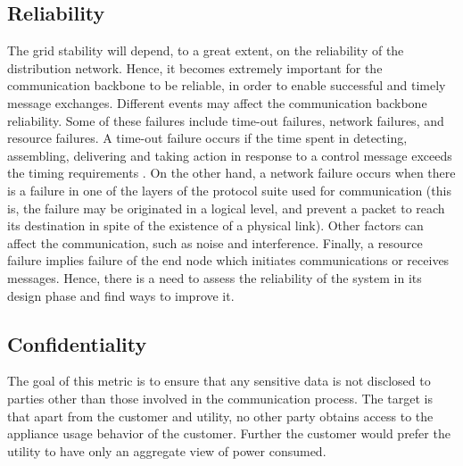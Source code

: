 \documentclass[11pt,final,onecolumn]{IEEEtran}
\begin{document}
\subsection{Reliability}
The grid stability will depend, to a great extent, on the reliability of the distribution network. Hence, it becomes extremely important for the communication backbone to be reliable, in order to enable successful and timely message exchanges. Different events may affect the communication backbone reliability. Some of these failures include time-out failures, network failures, and resource failures. A time-out failure occurs if the time spent in detecting, assembling, delivering and taking action in response to a control message exceeds the timing requirements \cite{Wang2011a}. On the other hand, a network failure occurs when there is a failure in one of the layers of the protocol suite used for communication (this is, the failure may be originated in a logical level, and prevent a packet to reach its destination in spite of the existence of a physical link). Other factors can affect the communication, such as noise and interference. Finally, a resource failure implies failure of the end node which initiates communications or receives messages. Hence, there is a need to assess the reliability of the system in its design phase and find ways to improve it.

\subsection{Confidentiality}
The goal of this metric is to ensure that any sensitive data is not disclosed to parties other than those involved in the communication process. The target is that apart from the customer and utility, no other party obtains access to the appliance usage behavior of the customer. Further the customer would prefer the utility to have only an aggregate view of power consumed.
\end{document}
